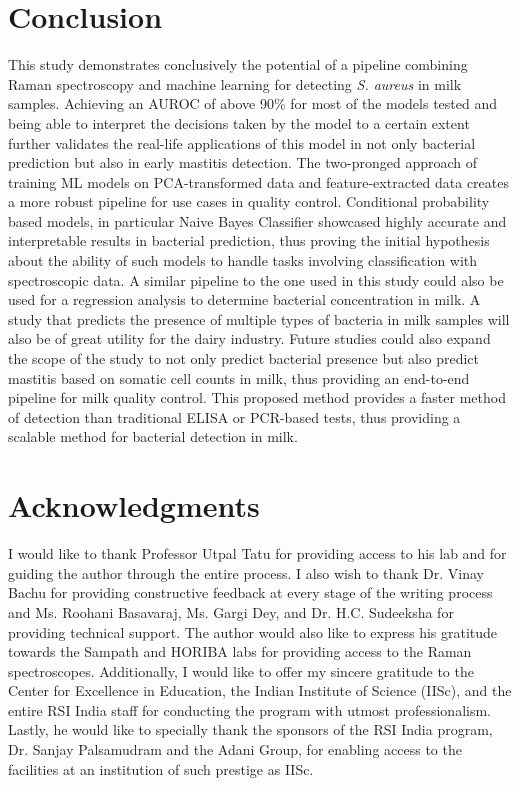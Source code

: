 \section{Conclusion} \label{sec:conclusion}

This study demonstrates conclusively the potential of a pipeline combining Raman spectroscopy and machine learning for detecting \textit{S. aureus} in milk samples. Achieving an AUROC of above 90\% for most of the models tested and being able to interpret the decisions taken by the model to a certain extent further validates the real-life applications of this model in not only bacterial prediction but also in early mastitis detection. The two-pronged approach of training ML models on PCA-transformed data and feature-extracted data creates a more robust pipeline for use cases in quality control. Conditional probability based models, in particular Naive Bayes Classifier showcased highly accurate and interpretable results in bacterial prediction, thus proving the initial hypothesis about the ability of such models to handle tasks involving classification with spectroscopic data. A similar pipeline to the one used in this study could also be used for a regression analysis to determine bacterial concentration in milk. A study that predicts the presence of multiple types of bacteria in milk samples will also be of great utility for the dairy industry. Future studies could also expand the scope of the study to not only predict bacterial presence but also predict mastitis based on somatic cell counts in milk, thus providing an end-to-end pipeline for milk quality control. This proposed method provides a faster method of detection than traditional ELISA or PCR-based tests, thus providing a scalable method for bacterial detection in milk. 


\section{Acknowledgments} 

I would like to thank Professor Utpal Tatu for providing access to his lab and for guiding the author through the entire process. I also wish to thank Dr. Vinay Bachu for providing constructive feedback at every stage of the writing process and Ms. Roohani Basavaraj, Ms. Gargi Dey, and Dr. H.C. Sudeeksha for providing technical support. The author would also like to express his gratitude towards the Sampath and HORIBA labs for providing access to the Raman spectroscopes. Additionally, I would like to offer my sincere gratitude to the Center for Excellence in Education, the Indian Institute of Science (IISc), and the entire RSI India staff for conducting the program with utmost professionalism. Lastly, he would like to specially thank the sponsors of the RSI India program, Dr. Sanjay Palsamudram and the Adani Group, for enabling access to the facilities at an institution of such prestige as IISc. 

